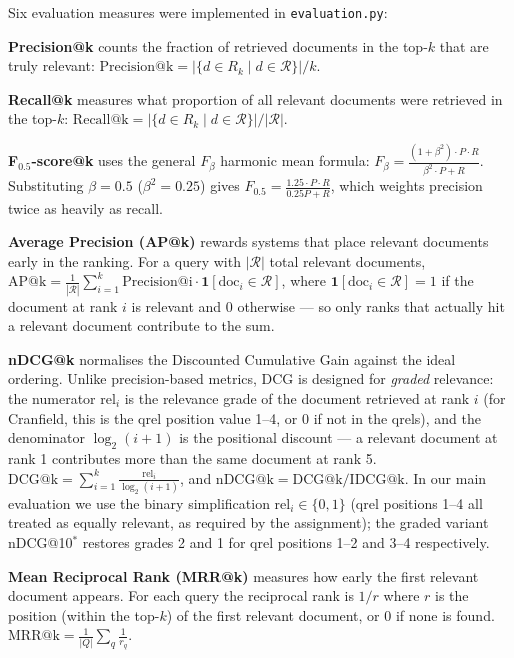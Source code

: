 \documentclass{article}
\begin{document}
Six evaluation measures were implemented in \texttt{evaluation.py}:

\textbf{Precision@k} counts the fraction of retrieved documents in the top-$k$ that are truly relevant:
$\mathrm{Precision@k} = |\{d \in R_k \mid d \in \mathcal{R}\}| / k$.

\textbf{Recall@k} measures what proportion of all relevant documents were retrieved in the top-$k$:
$\mathrm{Recall@k} = |\{d \in R_k \mid d \in \mathcal{R}\}| / |\mathcal{R}|$.

\textbf{F$_{0.5}$-score@k} uses the general $F_\beta$ harmonic mean formula:
$F_\beta = \frac{(1+\beta^2) \cdot P \cdot R}{\beta^2 \cdot P + R}$.
Substituting $\beta = 0.5$ ($\beta^2 = 0.25$) gives $F_{0.5} = \frac{1.25 \cdot P \cdot R}{0.25P + R}$, which weights precision twice as heavily as recall.

\textbf{Average Precision (AP@k)} rewards systems that place relevant documents early in the ranking. For a query with $|\mathcal{R}|$ total relevant documents,
$\mathrm{AP@k} = \frac{1}{|\mathcal{R}|} \sum_{i=1}^{k} \mathrm{Precision@i} \cdot \mathbf{1}[\mathrm{doc}_i \in \mathcal{R}]$,
where $\mathbf{1}[\mathrm{doc}_i \in \mathcal{R}] = 1$ if the document at rank $i$ is relevant and 0 otherwise --- so only ranks that actually hit a relevant document contribute to the sum.

\textbf{nDCG@k} normalises the Discounted Cumulative Gain against the ideal ordering. Unlike precision-based metrics, DCG is designed for \emph{graded} relevance: the numerator $\mathrm{rel}_i$ is the relevance grade of the document retrieved at rank $i$ (for Cranfield, this is the qrel position value 1--4, or 0 if not in the qrels), and the denominator $\log_2(i+1)$ is the positional discount --- a relevant document at rank 1 contributes more than the same document at rank 5. $\mathrm{DCG@k} = \sum_{i=1}^{k} \frac{\mathrm{rel}_i}{\log_2(i+1)}$, and $\mathrm{nDCG@k} = \mathrm{DCG@k} / \mathrm{IDCG@k}$. In our main evaluation we use the binary simplification $\mathrm{rel}_i \in \{0,1\}$ (qrel positions 1--4 all treated as equally relevant, as required by the assignment); the graded variant nDCG@10$^*$ restores grades 2 and 1 for qrel positions 1--2 and 3--4 respectively.

\textbf{Mean Reciprocal Rank (MRR@k)} measures how early the first relevant document appears. For each query the reciprocal rank is $1/r$ where $r$ is the position (within the top-$k$) of the first relevant document, or 0 if none is found. $\mathrm{MRR@k} = \frac{1}{|Q|} \sum_{q} \frac{1}{r_q}$.
\end{document}
